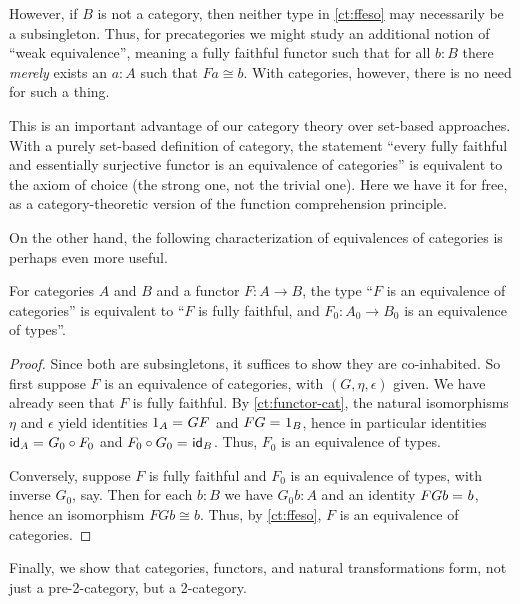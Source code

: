 However, if $B$ is not a category, then neither type in \autoref{ct:ffeso} may necessarily be a subsingleton.
Thus, for precategories we might study an additional notion of ``weak equivalence'', meaning a fully faithful functor such that for all $b:B$ there \emph{merely} exists an $a:A$ such that $Fa\cong b$.
With categories, however, there is no need for such a thing.

This is an important advantage of our category theory over set-based approaches.
With a purely set-based definition of category, the statement ``every fully faithful and essentially surjective functor is an equivalence of categories'' is equivalent to the axiom of choice (the strong one, not the trivial one).
Here we have it for free, as a category-theoretic version of the function comprehension principle.

On the other hand, the following characterization of equivalences of categories is perhaps even more useful.

\begin{lem}\label{ct:eqv-levelwise}
  For categories $A$ and $B$ and a functor $F:A\to B$, the type ``$F$ is an equivalence of categories'' is equivalent to ``$F$ is fully faithful, and $F_0:A_0\to B_0$ is an equivalence of types''.
\end{lem}
\begin{proof}
  Since both are subsingletons, it suffices to show they are co-inhabited.
  So first suppose $F$ is an equivalence of categories, with $(G,\eta,\epsilon)$ given.
  We have already seen that $F$ is fully faithful.
  By \autoref{ct:functor-cat}, the natural isomorphisms $\eta$ and $\epsilon$ yield identities $\id{1_A}{GF}$ and $\id{FG}{1_B}$, hence in particular identities $\id{\idfunc[A]}{G_0\circ F_0}$ and $\id{F_0\circ G_0}{\idfunc[B]}$.
Thus, $F_0$ is an equivalence of types.

  Conversely, suppose $F$ is fully faithful and $F_0$ is an equivalence of types, with inverse $G_0$, say.
  Then for each $b:B$ we have $G_0 b:A$ and an identity $\id{FGb}{b}$, hence an isomorphism $FGb\cong b$.
  Thus, by \autoref{ct:ffeso}, $F$ is an equivalence of categories.
\end{proof}

Finally, we show that categories, functors, and natural transformations form, not just a pre-2-category, but a 2-category.

